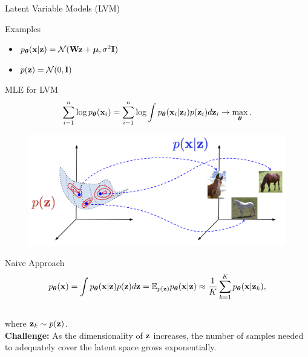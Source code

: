 \documentclass{beamer}
\begin{document}
\begin{frame}{Latent Variable Models (LVM)}
\begin{block}{Examples}
\begin{minipage}[t]{0.53\columnwidth}
\begin{figure}
			\end{figure}
			\vspace{-0.3cm}
			\begin{itemize}
				\item $p_{\boldsymbol{\theta}}(\mathbf{x} | \mathbf{z}) = \mathcal{N}(\mathbf{W} \mathbf{z} + \boldsymbol{\mu}, \sigma^2 \mathbf{I})$
				\item $p(\mathbf{z}) = \mathcal{N}(0, \mathbf{I})$
			\end{itemize}
		\end{minipage}
	\end{block}
\end{frame}
\begin{frame}{MLE for LVM}
	\[
		\sum_{i=1}^n \log p_{\boldsymbol{\theta}}(\mathbf{x}_i) = \sum_{i=1}^n \log \int p_{\boldsymbol{\theta}}(\mathbf{x}_i| \mathbf{z}_i) p(\mathbf{z}_i) d\mathbf{z}_i \rightarrow \max_{\boldsymbol{\theta}}.
	\]
    \eqpause
	\vspace{-0.7cm}
	\begin{figure}
		\includegraphics[width=.65\linewidth]{figs/lvm_diagram}
	\end{figure}
    \eqpause
	\vspace{-0.5cm}
	\begin{block}{Naive Approach}
		\vspace{-0.7cm}
		\[
			p_{\boldsymbol{\theta}}(\mathbf{x}) = \int p_{\boldsymbol{\theta}}(\mathbf{x} | \mathbf{z}) p(\mathbf{z}) d\mathbf{z} = \mathbb{E}_{p(\mathbf{z})} p_{\boldsymbol{\theta}}(\mathbf{x} | \mathbf{z}) \approx \frac{1}{K} \sum_{k=1}^{K} p_{\boldsymbol{\theta}}(\mathbf{x} | \mathbf{z}_k),
		\]
		\vspace{-0.5cm} \\
		where $\mathbf{z}_k \sim p(\mathbf{z})$. \\
        \eqpause
		\textbf{Challenge:} As the dimensionality of $\mathbf{z}$ increases, the number of samples needed to adequately cover the latent space grows exponentially.
	\end{block}
\end{frame}
\end{document}
